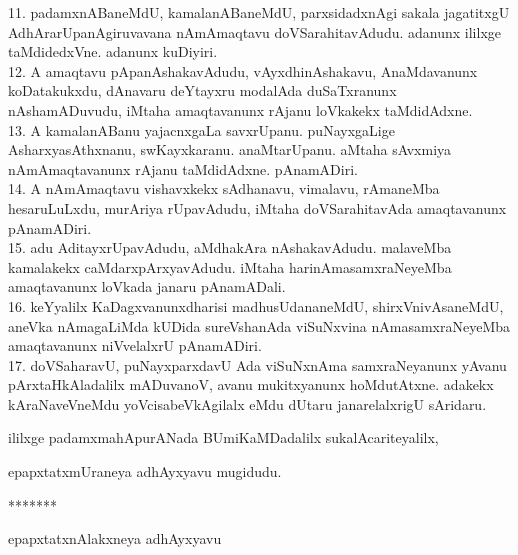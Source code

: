 \documentclass{article}
\begin{document}
11. padamxnABaneMdU, kamalanABaneMdU, parxsidadxnAgi sakala jagatitxgU AdhArarUpanAgiruvavana nAmAmaqtavu doVSarahitavAdudu. adanunx ililxge taMdidedxVne. adanunx kuDiyiri.\\
12. A amaqtavu pApanAshakavAdudu, vAyxdhinAshakavu, AnaMdavanunx koDatakukxdu, dAnavaru deYtayxru modalAda duSaTxranunx nAshamADuvudu, iMtaha amaqtavanunx rAjanu loVkakekx taMdidAdxne.\\
13. A kamalanABanu yajacnxgaLa savxrUpanu. puNayxgaLige AsharxyasAthxnanu, swKayxkaranu. anaMtarUpanu. aMtaha sAvxmiya nAmAmaqtavanunx rAjanu taMdidAdxne. pAnamADiri.\\
14. A nAmAmaqtavu vishavxkekx sAdhanavu, vimalavu, rAmaneMba hesaruLuLxdu, murAriya rUpavAdudu, iMtaha doVSarahitavAda amaqtavanunx pAnamADiri.\\
15. adu AditayxrUpavAdudu, aMdhakAra nAshakavAdudu. malaveMba kamalakekx caMdarxpArxyavAdudu. iMtaha harinAmasamxraNeyeMba amaqtavanunx loVkada janaru pAnamADali.\\
16. keYyalilx KaDagxvanunxdharisi madhusUdananeMdU, shirxVnivAsaneMdU, aneVka nAmagaLiMda kUDida sureVshanAda viSuNxvina nAmasamxraNeyeMba amaqtavanunx niVvelalxrU pAnamADiri.\\
17. doVSaharavU, puNayxparxdavU Ada viSuNxnAma samxraNeyanunx yAvanu pArxtaHkAladalilx mADuvanoV, avanu mukitxyanunx hoMdutAtxne. adakekx kAraNaveVneMdu yoVcisabeVkAgilalx eMdu dUtaru janarelalxrigU sAridaru.\\

\begin{center}
ililxge padamxmahApurANada BUmiKaMDadalilx sukalAcariteyalilx,
\end{center}

\begin{center}
epapxtatxmUraneya adhAyxyavu mugidudu.
\end{center}

\begin{center}
*******
\end{center}

\begin{center}
epapxtatxnAlakxneya adhAyxyavu
\end{center}
\end{document}

